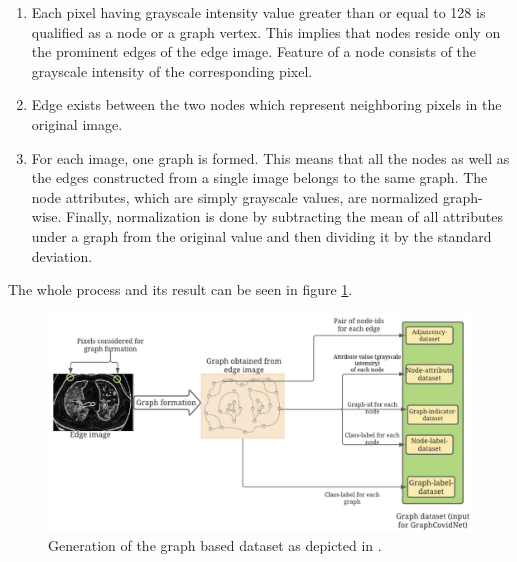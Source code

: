\begin{displayquote}
    \begin{enumerate}
        \item Each pixel having grayscale intensity value greater than or equal to 128 is qualified as a node or a graph vertex. This implies that nodes reside only on the prominent edges of the edge image. Feature of a node consists of the grayscale intensity of the corresponding pixel.
        \item Edge exists between the two nodes which represent neighboring pixels in the original image.
        \item For each image, one graph is formed. This means that all the nodes as well as the edges constructed from a single image belongs to the same graph. The node attributes, which are simply grayscale values, are normalized graph-wise. Finally, normalization is done by subtracting the mean of all attributes under a graph from the original value and then dividing it by the standard deviation.  
    \end{enumerate}
\end{displayquote}

The whole process and its result can be seen in figure \ref{fig:graphcovidnet_graph_generation}.

\begin{figure}[htbp]
    \centering
    \includegraphics[width=1.0\linewidth]{imgs/graphcovidnet_graph_generation.png}
    \caption{Generation of the graph based dataset as depicted in \cite{graph_covid_net}.}
    \label{fig:graphcovidnet_graph_generation}
\end{figure}
